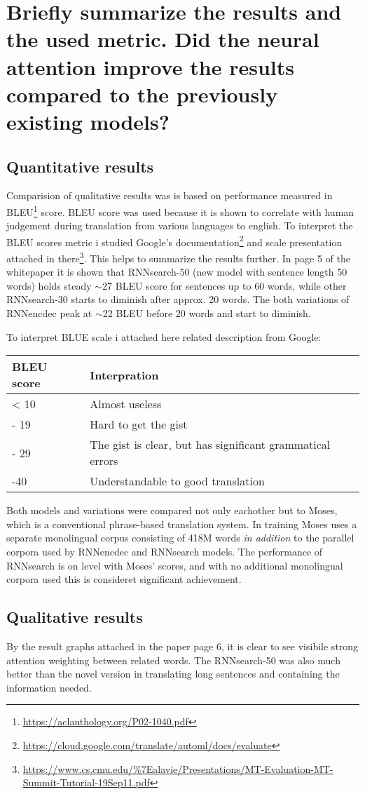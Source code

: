 \documentclass{article}
\begin{document}
\section{Briefly summarize the results and the used metric. Did the neural attention improve the results compared to the previously existing models?}

\subsection{Quantitative results}

Comparision of qualitative results was is based on performance measured in BLEU\footnote{\url{https://aclanthology.org/P02-1040.pdf}} score. BLEU score was used because it is shown to correlate with human judgement during translation from various languages to english.
To interpret the BLEU scores metric i studied Google's documentation\footnote{\url{https://cloud.google.com/translate/automl/docs/evaluate}} and scale presentation attached in there\footnote{\url{https://www.cs.cmu.edu/\%7Ealavie/Presentations/MT-Evaluation-MT-Summit-Tutorial-19Sep11.pdf}}. This helps to summarize the results further.
In page 5 of the whitepaper it is shown that RNNsearch-50 (new model with sentence length 50 words) holds steady $\sim$27 BLEU score for sentences up to 60 words, while other RNNsearch-30 starts to diminish after approx. 20 words. The both variations of RNNencdec peak at $\sim$22 BLEU before 20 words and start to diminish.

To interpret BLUE scale i attached here related description from Google:

\begin{tabularx}{0.8\textwidth} { 
    | >{\raggedright\arraybackslash}X 
    | >{\raggedleft\arraybackslash}X | }
   \hline
   BLEU score & Interpration \\
   \hline
   < 10  & Almost useless  \\
   10 - 19 & Hard to get the gist \\
   \hline
   20 - 29 & The gist is clear, but has significant grammatical errors\\
   \hline
   30-40 & Understandable to good translation\\
  \hline
  \end{tabularx}


Both models and variations were compared not only eachother but to Moses, which is a conventional phrase-based translation system. In training Moses uses a separate monolingual corpus consisting of 418M words \emph{in addition} to the parallel corpora used by RNNencdec and RNNsearch models.
The performance of RNNsearch is on level with Moses' scores, and with no additional monolingual corpora used this is consideret significant achievement.

\subsection{Qualitative results}

By the result graphs attached in the paper page 6, it is clear to see visibile strong attention weighting between related words. The RNNsearch-50 was also much better than the novel version in translating long sentences and containing the information needed.
\end{document}
